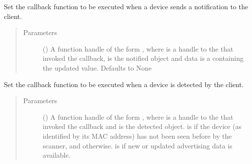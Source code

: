 \documentclass[letterpaper,10pt,english]{sphinxmanual}
\begin{document}
\begin{fulllineitems}
\begin{fulllineitems}
\label{\detokenize{simpleble:simpleble.SimpleBleClient.setNotificationCallback}}
Set the callback function to be executed when a device sends a notification to the client.
\begin{quote}\begin{description}
\item[{Parameters}] \leavevmode
{} (\sphinxstyleliteralemphasis{\sphinxupquote{, }}) \textendash{} A function handle of the form , where  is a handle to the {\hyperref[\detokenize{simpleble:simpleble.SimpleBleClient}]{}} that invoked the callback,  is the notified  object and data is a  containing the updated value. Defaults to None

\end{description}\end{quote}

\end{fulllineitems}


\begin{fulllineitems}
\label{\detokenize{simpleble:simpleble.SimpleBleClient.setScanCallback}}
Set the callback function to be executed when a device is detected by the client.
\begin{quote}\begin{description}
\item[{Parameters}] \leavevmode
{} () \textendash{} A function handle of the form , where  is a handle to the {\hyperref[\detokenize{simpleble:simpleble.SimpleBleClient}]{}} that invoked the callback and  is the detected {\hyperref[\detokenize{simpleble:simpleble.SimpleBleDevice}]{}} object.  is  if the device (as identified by its MAC address) has not been seen before by the scanner, and  otherwise.  is  if new or updated advertising data is available.


\end{description}
\end{quote}
\end{fulllineitems}
\end{fulllineitems}
\end{document}
